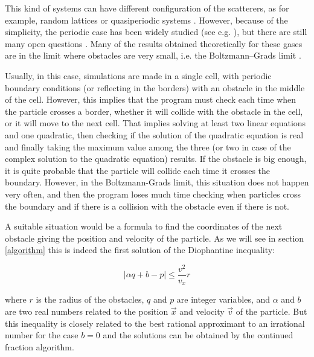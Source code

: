 \documentclass[prl,amsmath,amssymb, twocolumn, showpacs]{revtex4-1}
\begin{document}
This kind of systems can have different configuration of the scatterers, as for example, random lattices \cite{latz1997lyapunov,dellago1997lyapunov, van1998chaotic} or quasiperiodic systems \cite{kraemer2013embedding,wennberg2012free}. However, because of the simplicity, the periodic case has been widely studied (see e.g. \cite{bunimovich1981statistical,bleher1992statistical, chernov1994statistical, gilbert2011diffusive}), but there are still many open questions \cite{gilbert2009persistence,marklof2011periodic,nandori2012tail, dettmann2012new}. Many of the results obtained theoretically for these gases are in the limit where obstacles are very small, i.e. the Boltzmann--Grads limit \cite{caglioti2003distribution, golse2012recent,boca2007distribution,golse2006periodic,caglioti2008boltzmann,caglioti2010boltzmann, golse2000distribution,marklof2008kinetic, bourgain1998distribution}. 

Usually, in this case, simulations are made in a single cell, with periodic boundary conditions (or reflecting in the borders) with an obstacle in the middle of the cell\cite{sanders2008normal,  sanders2005fine}. However, this implies that the program must check each time when the particle crosses a border, whether it will collide with the obstacle in the cell, or it will move to the next cell. That implies solving at least two linear equations and one quadratic, then checking if the solution of the quadratic equation is real and finally taking the maximum value among the three (or two in case of the complex solution to the quadratic equation) results. If the obstacle is big enough, it is quite probable that the particle will collide each time it crosses the boundary. However, in the Boltzmann-Grads limit, this situation does not happen very often, and then the program loses much time checking when particles cross the boundary and if there is a collision with the obstacle even if there is not.

A suitable situation would be a formula to find the coordinates of the next obstacle giving the position and velocity of the particle. As we will see in section \ref{algorithm} this is indeed the first solution of the Diophantine inequality:

\begin{equation}
|\alpha q+b-p|\leq  \frac{v^2}{v_x} r
\end{equation}

where $r$ is the radius of the obstacles, $q$ and $p$ are integer variables, and $\alpha$ and $b$ are two real numbers related to the position $\vec{x}$ and velocity $\vec{v}$ of the particle. But this inequality is closely related to the best rational approximant to an irrational number for the case $b=0$ and the solutions can be obtained by the continued fraction algorithm. 
\end{document}
